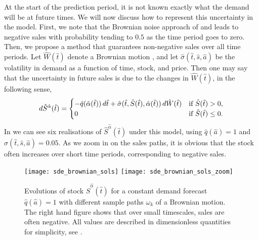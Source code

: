 \documentclass[main.tex]{subfiles}
\begin{document}
At the start of the prediction period, it is not known exactly what
the demand will be at future times. We will now discuss how to
represent this uncertainty in the model. First, we note that the Brownian noise
approach of \citet{raman1995optimal} and \citet{wu2016dynamic} leads to negative
sales with probability tending to $0.5$ as the time period goes to zero.
Then, we propose a method that guarantees non-negative sales over all
time periods.
Let $\hat{W}(\hat{t})$ denote a Brownian motion
\citep{oksendal2000stochastic}, and let
$\hat{\sigma}(\hat{t},\hat{s},\hat{a})$ be the volatility
in demand as a function of time, stock, and price. Then
one may say that the uncertainty in future
sales is due to the changes in $\hat{W}(\hat{t})$, in the following sense,
\begin{equation}\label{eq:brownian_noise}
  d\hat{S}^{\hat{\alpha}}(\hat{t}) =
  \begin{cases}
    -\hat{q}(\hat{\alpha}(\hat{t}))\,d\hat{t} +
    \hat{\sigma}(\hat{t},\hat{S}(\hat{t}),\hat{\alpha}(\hat{t}))\,d\hat{W}(\hat{t})
    & \textnormal{if } \hat{S}(\hat{t})>0,\\
    0 &  \textnormal{if } \hat{S}(\hat{t})\leq0.
  \end{cases}
\end{equation}
In  we can see six realisations of
$\hat{S}^{\hat{\alpha}}(\hat{t})$ under
this model, using $\hat{q}(\hat{a})=1$ and $\hat{\sigma}(\hat{t},\hat{s},\hat{a})=0.05$. As we zoom in on
the sales paths, it is obvious that the stock often
increases over short time periods, corresponding to negative sales.
\begin{figure}[htbp]
  \centering
  \texttt{[image: sde\_brownian\_sols]}%
  \texttt{[image: sde\_brownian\_sols\_zoom]}
  \caption{Evolutions of stock $\hat{S}^{\hat{\alpha}}(\hat{t})$ for a constant
    demand forecast $\hat{q}(\hat{a})=1$ with different sample paths $\omega_k$
    of a Brownian motion.
    The right hand figure shows that over small timescales, sales are
    often negative.
    All values are described in dimensionless quantities for
    simplicity, see .
  }\label{fig:brownian_paths}
\end{figure}
\end{document}

